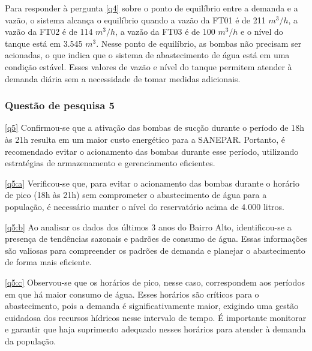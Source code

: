 Para responder à pergunta \ref{q4} sobre o ponto de equilíbrio entre a demanda e a vazão, o sistema alcança o equilíbrio quando a vazão da FT01 é de 211 $m^3/h$, a vazão da FT02 é de 114 $m^3/h$, a vazão da FT03 é de 100 $m^3/h$ e o nível do tanque está em 3.545 $m^3$. Nesse ponto de equilíbrio, as bombas não precisam ser acionadas, o que indica que o sistema de abastecimento de água está em uma condição estável. Esses valores de vazão e nível do tanque permitem atender à demanda diária sem a necessidade de tomar medidas adicionais.


\subsubsection{Quest\~ao de pesquisa 5}

\ref{q5} Confirmou-se que a ativação das bombas de sucção durante o período de 18h às 21h resulta em um maior custo energético para a SANEPAR. Portanto, é recomendado evitar o acionamento das bombas durante esse período, utilizando estratégias de armazenamento e gerenciamento eficientes.

\ref{q5:a} Verificou-se que, para evitar o acionamento das bombas durante o horário de pico (18h às 21h) sem comprometer o abastecimento de água para a população, é necessário manter o nível do reservatório acima de 4.000 litros.

\ref{q5:b} Ao analisar os dados dos últimos 3 anos do Bairro Alto, identificou-se a presença de tendências sazonais e padrões de consumo de água. Essas informações são valiosas para compreender os padrões de demanda e planejar o abastecimento de forma mais eficiente.

\ref{q5:c} Observou-se que os horários de pico, nesse caso, correspondem aos períodos em que há maior consumo de água. Esses horários são críticos para o abastecimento, pois a demanda é significativamente maior, exigindo uma gestão cuidadosa dos recursos hídricos nesse intervalo de tempo. É importante monitorar e garantir que haja suprimento adequado nesses horários para atender à demanda da população.



